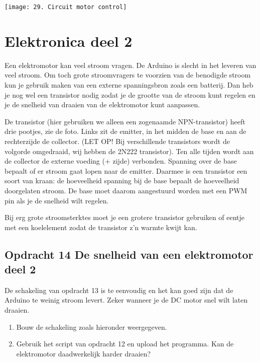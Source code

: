 \documentclass{arduino}
\begin{document}
\begin{center}
\texttt{[image: 29. Circuit motor control]}
\end{center}

\newpage

\section{Elektronica deel 2}




Een elektromotor kan veel stroom vragen. De Arduino is slecht in het leveren van veel stroom. Om toch grote stroomvragers te voorzien van de benodigde stroom kun je gebruik maken van een externe spanningsbron zoals een batterij. Dan heb je nog wel een transistor nodig zodat je de grootte van de stroom kunt regelen en je de snelheid van draaien van de elektromotor kunt aanpassen.

De transistor (hier gebruiken we alleen een zogenaamde NPN-transistor) heeft drie pootjes, zie de foto. Links zit de emitter, in het midden de base en aan de rechterzijde de collector. (LET OP! Bij verschillende transistors wordt de volgorde omgedraaid, wij hebben de 2N222 transistor). Ten alle tijden wordt aan de collector de externe voeding (+ zijde) verbonden. Spanning over de base bepaalt of er stroom gaat lopen naar de emitter. Daarmee is een transistor een soort van kraan: de hoeveelheid spanning bij de base bepaalt de hoeveelheid doorgelaten stroom. De base moet daarom aangestuurd worden met een PWM pin als je de snelheid wilt regelen.

Bij erg grote stroomsterktes moet je een grotere transistor gebruiken of eentje met een koelelement zodat de transistor z’n warmte kwijt kan.

\subsection{Opdracht 14 De snelheid van een elektromotor deel 2}

De schakeling van opdracht 13 is te eenvoudig en het kan goed zijn dat de Arduino te weinig stroom levert. Zeker wanneer je de DC motor snel wilt laten draaien.

\begin{enumerate}[label={\alph*})]
\item Bouw de schakeling zoals hieronder weergegeven.

\item Gebruik het script van opdracht 12 en upload het programma. Kan de elektromotor daadwerkelijk harder draaien?
\end{enumerate}
\end{document}
